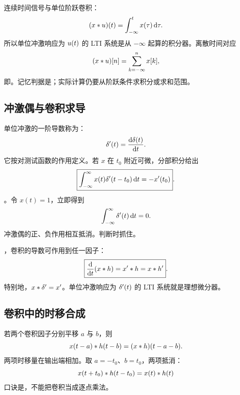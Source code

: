 连续时间信号与单位阶跃卷积：
\begin{equation}
  (x\mathbin{\ast}u)(t)
  =\int_{-\infty}^{t}x(\tau)\mathop{}\!\mathrm{d}\tau.
  \label{eq:convolution-with-step-continuous}
\end{equation}
所以单位冲激响应为 $u(t)$ 的 LTI 系统是从 $-\infty$ 起算的积分器。离散时间对应
\begin{equation}
  (x\mathbin{\ast}u)[n]
  =\sum_{k=-\infty}^{n}x[k],
  \label{eq:convolution-with-step-discrete}
\end{equation}
即。记忆判据是；实际计算仍要从阶跃条件求积分或求和范围。

\subsection{冲激偶与卷积求导}

单位冲激的一阶导数称为：
\begin{equation}
  \delta'(t)=\frac{\mathop{}\!\mathrm{d}\delta(t)}{\mathop{}\!\mathrm{d} t}.
  \label{eq:impulse-doublet-definition}
\end{equation}
它按对测试函数的作用定义。若 $x$ 在 $t_0$ 附近可微，分部积分给出
\begin{equation}
  \boxed{
    \int_{-\infty}^{\infty}
    x(t)\delta'(t-t_0)\mathop{}\!\mathrm{d} t
    =-x'(t_0)
  }.
  \label{eq:impulse-doublet-sifting}
\end{equation}
。令 $x(t)=1$，立即得到
\begin{equation}
  \int_{-\infty}^{\infty}\delta'(t)\mathop{}\!\mathrm{d} t=0.
  \label{eq:impulse-doublet-zero-area}
\end{equation}
冲激偶的正、负作用相互抵消。判断时抓住。

，卷积的导数可作用到任一因子：
\begin{equation}
  \boxed{
    \frac{\mathop{}\!\mathrm{d}}{\mathop{}\!\mathrm{d} t}(x\mathbin{\ast} h)
    =x'\mathbin{\ast} h
    =x\mathbin{\ast} h'
  }.
  \label{eq:differentiation-of-convolution}
\end{equation}
特别地，$x\mathbin{\ast}\delta'=x'$。单位冲激响应为 $\delta'(t)$ 的 LTI 系统就是理想微分器。

\subsection{卷积中的时移合成}

若两个卷积因子分别平移 $a$ 与 $b$，则
\begin{equation}
  x(t-a)\mathbin{\ast} h(t-b)
  =(x\mathbin{\ast} h)(t-a-b).
  \label{eq:convolution-shift-composition}
\end{equation}
两项时移量在输出端相加。取 $a=-t_0$、$b=t_0$，两项抵消：
\begin{equation}
  x(t+t_0)\mathbin{\ast} h(t-t_0)=x(t)\mathbin{\ast} h(t)
  \label{eq:opposite-shifts-cancel}
\end{equation}
口诀是，不能把卷积当成逐点乘法。

